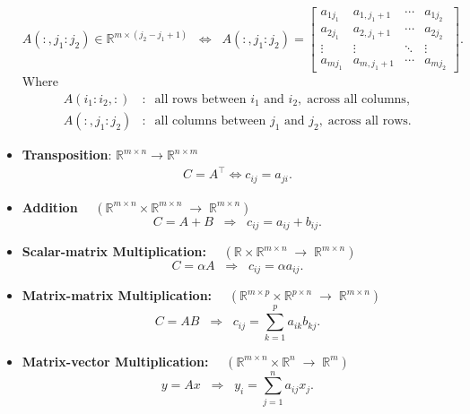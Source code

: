 \documentclass{report}
\begin{document}
\begin{itemize}
            \[
                A(:,j_{1}:j_{2}) \in \mathbb{R}^{m \times (j_{2}-j_{1}+1)}
                \;\;\Longleftrightarrow\;\;
                A(:,j_{1}:j_{2}) =
                \begin{bmatrix}
                    a_{1j_{1}} & a_{1,j_{1}+1} & \cdots & a_{1j_{2}} \\
                    a_{2j_{1}} & a_{2,j_{1}+1} & \cdots & a_{2j_{2}} \\
                    \vdots & \vdots & \ddots & \vdots \\
                    a_{mj_{1}} & a_{m,j_{1}+1} & \cdots & a_{mj_{2}}
                \end{bmatrix}.
            \]
            Where
            \[
                \begin{aligned}
                    A(i_{1}:i_{2},:) &:\;\; \text{all rows between } i_{1} \text{ and } i_{2}, \;\text{across all columns}, \\[6pt]
                    A(:,j_{1}:j_{2}) &:\;\; \text{all columns between } j_{1} \text{ and } j_{2}, \;\text{across all rows}.
                \end{aligned}
            \]
        \item \textbf{Transposition}: $\mathbb{R}^{m\times n} \to \mathbb{R}^{n\times m} $
            \begin{align*}
                C = A^{\top} \iff c_{ij} = a_{ji}
            .\end{align*}
        \item \textbf{Addition} $\quad (\mathbb{R}^{m \times n} \times \mathbb{R}^{m \times n} \;\to\; \mathbb{R}^{m \times n})$
            \[
                C = A + B 
                \;\;\Longrightarrow\;\; 
                c_{ij} = a_{ij} + b_{ij}.
            \]

        \item \textbf{Scalar-matrix Multiplication: } $\quad (\mathbb{R} \times \mathbb{R}^{m \times n} \;\to\; \mathbb{R}^{m \times n})$
            \[
                C = \alpha A 
                \;\;\Longrightarrow\;\; 
                c_{ij} = \alpha a_{ij}.
            \]

        \item \textbf{Matrix-matrix Multiplication: } $\quad (\mathbb{R}^{m \times p} \times \mathbb{R}^{p \times n} \;\to\; \mathbb{R}^{m \times n})$
            \[
                C = AB 
                \;\;\Longrightarrow\;\; 
                c_{ij} = \sum_{k=1}^{p} a_{ik} b_{kj}.
            \]
        \item \textbf{Matrix-vector Multiplication: } $\quad (\mathbb{R}^{m \times n} \times \mathbb{R}^n \;\to\; \mathbb{R}^m)$
            \[
                y = Ax 
                \;\;\Longrightarrow\;\; 
                y_i = \sum_{j=1}^{n} a_{ij} x_j.
            \]


\end{itemize}
\end{document}
